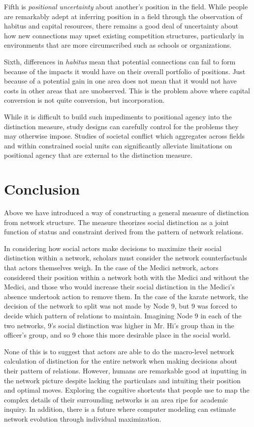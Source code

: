\documentclass[12pt]{article}
\begin{document}
Fifth is \textit{positional uncertainty} about another's position in the field. While people are remarkably adept at inferring position in a field through the observation of habitus and capital resources, there remains a good deal of uncertainty about how new connections may upset existing competition structures, particularly in environments that are more circumscribed such as schools or organizations.     

Sixth, differences in \textit{habitus} mean that potential connections can fail to form because of the impacts it would have on their overall portfolio of positions. Just because of a potential gain in one area does not mean that it would not have costs in other areas that are unobserved. This is the problem above where capital conversion is not quite conversion, but incorporation.  

While it is difficult to build such impediments to positional agency into the distinction measure, study designs can carefully control for the problems they may otherwise impose. Studies of societal conflict which aggregates across fields and within constrained social units can significantly alleviate limitations on positional agency that are external to the distinction measure.  

\section{Conclusion}
Above we have introduced a way of constructing a general measure of distinction from network structure. The measure theorizes social distinction as a joint function of status and constraint derived from the pattern of network relations. 

In considering how social actors make decisions to maximize their social distinction within a network, scholars must consider the network counterfactuals that actors themselves weigh. In the case of the Medici network, actors considered their position within a network both with the Medici and without the Medici, and those who would increase their social distinction in the Medici’s absence undertook action to remove them. In the case of the karate network, the decision of the network to split was not made by Node 9, but 9 was forced to decide which pattern of relations to maintain. Imagining Node 9 in each of the two networks, 9’s social distinction was higher in Mr. Hi’s group than in the officer’s group, and so 9 chose this more desirable place in the social world. 

None of this is to suggest that actors are able to do the macro-level network calculation of distinction for the entire network when making decisions about their pattern of relations. However, humans are remarkable good at inputting in the network picture despite lacking the particulars and intuiting their position and optimal moves. Exploring the cognitive shortcuts that people use to map the complex details of their surrounding networks is an area ripe for academic inquiry. In addition, there is a future where computer modeling can estimate network evolution through individual maximization. 
\end{document}
